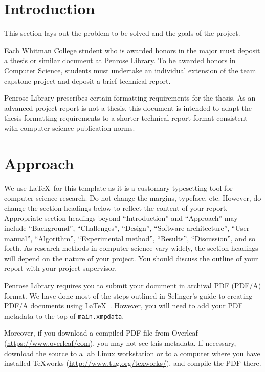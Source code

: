 \documentclass{article}
\begin{document}
\section{Introduction}

This section lays out the problem to be solved and the goals of the project.

Each Whitman College student who is awarded honors in the major must deposit a thesis or similar document at Penrose Library.  To be awarded honors in Computer Science, students must undertake an individual extension of the team capstone project and deposit a brief technical report.

Penrose Library prescribes certain formatting requirements for the thesis. As an advanced project report is not a thesis, this document is intended to adapt the thesis formatting requirements to a shorter technical report format consistent with computer science publication norms. 

\section{Approach}

We use \LaTeX\ for this template as it is a customary typesetting tool for computer science research. Do not change the margins, typeface, etc. However, do change the section headings below to reflect the content of your report. Appropriate section headings beyond ``Introduction'' and ``Approach'' may include ``Background'', ``Challenges'', ``Design'', ``Software architecture'', ``User manual'', ``Algorithm'', ``Experimental method'', ``Results'', ``Discussion'',  and so forth. As research methods in computer science vary widely, the section headings will depend on the nature of your project. You should discuss the outline of your report with your project supervisor.

Penrose Library requires you to submit your document in archival PDF (PDF/A) format.  We have done most of the steps outlined in Selinger's guide to creating PDF/A documents using \LaTeX~\cite{Selinger:pdfa}. However, you will need to add your PDF metadata to the top of \texttt{main.xmpdata}. 

Moreover, if you download a compiled PDF file from Overleaf (\url{https://www.overleaf/com}), you may not see this metadata. 
If necessary, download the source to a lab Linux workstation or to a computer where you have installed TeXworks (\url{http://www.tug.org/texworks/}), and compile the PDF there.  
\end{document}
